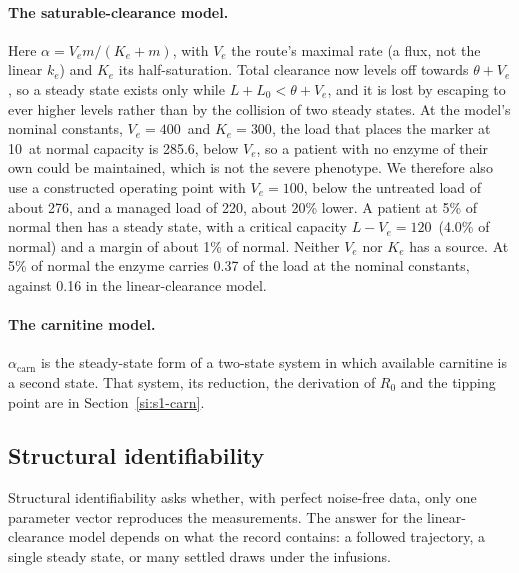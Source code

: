 \paragraph{The saturable-clearance model.} Here $\alpha=V_e m/(K_e+m)$, with $V_e$ the
route's maximal rate (a flux, not the linear $k_e$) and $K_e$ its half-saturation. Total
clearance now levels off towards $\theta+V_e$, so a steady state exists only while
$L+L_0<\theta+V_e$, and it is lost by escaping to ever higher levels rather than by the
collision of two steady states. At the model's nominal constants, $V_e=400$\um\ and
$K_e=300$\uM, the load that places the marker at 10\uM\ at normal capacity is 285.6\um,
below $V_e$, so a patient with no enzyme of their own could be maintained, which is not the
severe phenotype. We therefore also use a constructed operating point with $V_e=100$\um,
below the untreated load of about 276\um, and a managed load of 220\um, about 20\% lower. A
patient at 5\% of normal then has a steady state, with a critical capacity
$L-V_e=120$\um\ (4.0\% of normal) and a margin of about 1\% of normal. Neither $V_e$ nor
$K_e$ has a source. At 5\% of normal the enzyme carries 0.37 of the load at the nominal
constants, against 0.16 in the linear-clearance model.

\paragraph{The carnitine model.} $\alpha_{\mathrm{carn}}$ is the steady-state form of a
two-state system in which available carnitine is a second state. That system, its
reduction, the derivation of $R_0$ and the tipping point are in
Section~\ref{si:s1-carn}.

\subsection{Structural identifiability}
\label{si:s1-si}

Structural identifiability asks whether, with perfect noise-free data, only one parameter
vector reproduces the measurements. The answer for the linear-clearance model depends on
what the record contains: a followed trajectory, a single steady state, or many settled
draws under the infusions.

